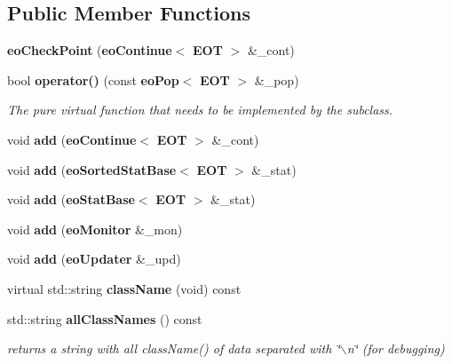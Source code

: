 \subsection*{Public Member Functions}
\begin{CompactItemize}
\item 
{\bf eo\-Check\-Point} ({\bf eo\-Continue}$<$ {\bf EOT} $>$ \&\_\-cont)\label{classeo_check_point_a0}

\item 
bool {\bf operator()} (const {\bf eo\-Pop}$<$ {\bf EOT} $>$ \&\_\-pop)\label{classeo_check_point_a1}

\begin{CompactList}\small\item\em The pure virtual function that needs to be implemented by the subclass. \item\end{CompactList}\item 
void {\bf add} ({\bf eo\-Continue}$<$ {\bf EOT} $>$ \&\_\-cont)\label{classeo_check_point_a2}

\item 
void {\bf add} ({\bf eo\-Sorted\-Stat\-Base}$<$ {\bf EOT} $>$ \&\_\-stat)\label{classeo_check_point_a3}

\item 
void {\bf add} ({\bf eo\-Stat\-Base}$<$ {\bf EOT} $>$ \&\_\-stat)\label{classeo_check_point_a4}

\item 
void {\bf add} ({\bf eo\-Monitor} \&\_\-mon)\label{classeo_check_point_a5}

\item 
void {\bf add} ({\bf eo\-Updater} \&\_\-upd)\label{classeo_check_point_a6}

\item 
virtual std::string {\bf class\-Name} (void) const \label{classeo_check_point_a7}

\item 
std::string {\bf all\-Class\-Names} () const \label{classeo_check_point_a8}

\begin{CompactList}\small\item\em returns a string with all class\-Name() of data separated with \char`\"{}$\backslash$n\char`\"{} (for debugging) \item\end{CompactList}\end{CompactItemize}
